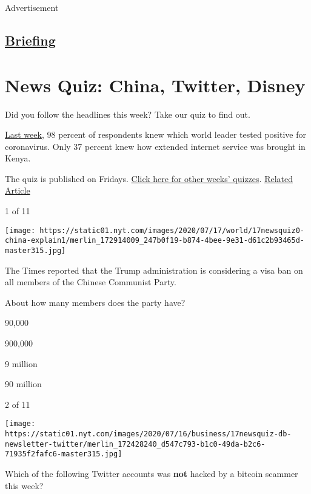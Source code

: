 Advertisement

\hypertarget{-briefing-}{%
\subsection{\texorpdfstring{
\href{/interactive/2018/briefing/global-morning-briefing-newsletter-signup.html}{Briefing}
}{ Briefing }}\label{-briefing-}}

\hypertarget{news-quiz-china-twitter-disney}{%
\section{News Quiz: China, Twitter,
Disney}\label{news-quiz-china-twitter-disney}}

Did you follow the headlines this week? Take our quiz to find out.

\href{https://www.nytimes.com/interactive/2020/07/10/briefing/vaccines-harpers-magazine-ennio-morricone-news-quiz.html}{Last
week}, 98 percent of respondents knew which world leader tested positive
for coronavirus. Only 37 percent knew how extended internet service was
brought in Kenya.

The quiz is published on Fridays.
\href{https://www.nytimes.com/spotlight/news-quiz}{Click here for other
weeks' quizzes}.
\href{https://www.nytimes.com/interactive/2020/07/10/briefing/vaccines-harpers-magazine-ennio-morricone-news-quiz.html}{Related
Article}

1 of 11

\texttt{[image: https://static01.nyt.com/images/2020/07/17/world/17newsquiz0-china-explain1/merlin\_172914009\_247b0f19-b874-4bee-9e31-d61c2b93465d-master315.jpg]}

The Times reported that the Trump administration is considering a visa
ban on all members of the Chinese Communist Party.

About how many members does the party have?

90,000

900,000

9 million

90 million

2 of 11

\texttt{[image: https://static01.nyt.com/images/2020/07/16/business/17newsquiz-db-newsletter-twitter/merlin\_172428240\_d547c793-b1c0-49da-b2c6-71935f2fafc6-master315.jpg]}

Which of the following Twitter accounts was \textbf{not} hacked by a
bitcoin scammer this week?

